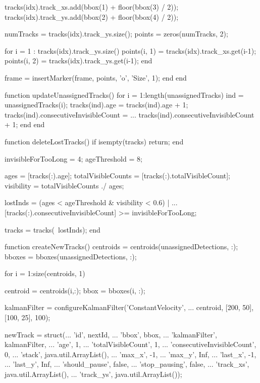 \documentclass[10pt,a4paper]{article}
\begin{document}
\begin{verbatimtab}[2]
			tracks(idx).track_xs.add(bbox(1) + floor(bbox(3) / 2));
			tracks(idx).track_ys.add(bbox(2) + floor(bbox(4) / 2));

			numTracks = tracks(idx).track_ys.size();
			points = zeros(numTracks, 2);

			for i = 1 : tracks(idx).track_ys.size()
				points(i, 1) = tracks(idx).track_xs.get(i-1);
				points(i, 2) = tracks(idx).track_ys.get(i-1);
			end

			frame = insertMarker(frame, points, 'o', 'Size', 1);
		end
	end

	function updateUnassignedTracks()
		for i = 1:length(unassignedTracks)
			ind = unassignedTracks(i);
			tracks(ind).age = tracks(ind).age + 1;
			tracks(ind).consecutiveInvisibleCount = ...
				tracks(ind).consecutiveInvisibleCount + 1;
		end
	end

	function deleteLostTracks()
		if isempty(tracks)
			return;
		end

		invisibleForTooLong = 4;
		ageThreshold = 8;

		ages = [tracks(:).age];
		totalVisibleCounts = [tracks(:).totalVisibleCount];
		visibility = totalVisibleCounts ./ ages;

		lostInds = (ages < ageThreshold & visibility < 0.6) | ...
			[tracks(:).consecutiveInvisibleCount] >= invisibleForTooLong;

		tracks = tracks(~lostInds);
	end

	function createNewTracks()
		centroids = centroids(unassignedDetections, :);
		bboxes = bboxes(unassignedDetections, :);

		for i = 1:size(centroids, 1)

			centroid = centroids(i,:);
			bbox = bboxes(i, :);

			kalmanFilter = configureKalmanFilter('ConstantVelocity', ...
				centroid, [200, 50], [100, 25], 100);

			newTrack = struct(...
				'id', nextId, ...
				'bbox', bbox, ...
				'kalmanFilter', kalmanFilter, ...
				'age', 1, ...
				'totalVisibleCount', 1, ...
				'consecutiveInvisibleCount', 0, ...
				'stack', java.util.ArrayList(), ...
				'max_x', -1, ...
				'max_y', Inf, ...
				'last_x', -1, ...
				'last_y', Inf, ...
				'should_pause', false, ...
				'stop_pausing', false, ...
				'track_xs', java.util.ArrayList(), ...
				'track_ys', java.util.ArrayList());


\end{verbatimtab}
\end{document}
